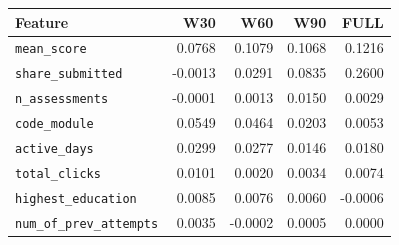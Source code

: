 \small
\setlength{\tabcolsep}{4pt}
\begin{tabular}{@{}lrrrr@{}}
\toprule
Feature & W30 & W60 & W90 & FULL \\
\midrule
\texttt{mean\_score} & 0.0768 & 0.1079 & 0.1068 & 0.1216 \\
\texttt{share\_submitted} & -0.0013 & 0.0291 & 0.0835 & 0.2600 \\
\texttt{n\_assessments} & -0.0001 & 0.0013 & 0.0150 & 0.0029 \\
\texttt{code\_module} & 0.0549 & 0.0464 & 0.0203 & 0.0053 \\
\texttt{active\_days} & 0.0299 & 0.0277 & 0.0146 & 0.0180 \\
\texttt{total\_clicks} & 0.0101 & 0.0020 & 0.0034 & 0.0074 \\
\texttt{highest\_education} & 0.0085 & 0.0076 & 0.0060 & -0.0006 \\
\texttt{num\_of\_prev\_attempts} & 0.0035 & -0.0002 & 0.0005 & 0.0000 \\
\bottomrule
\end{tabular}
